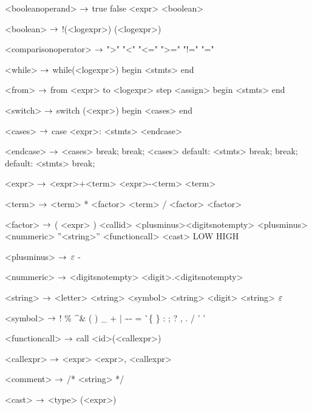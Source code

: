\begin{grammar}
<booleanoperand> $\rightarrow$ true
		\alt false
		\alt <boolean>

<boolean> $\rightarrow$ !(<logexpr>)
		\alt (<logexpr>)

<comparisonoperator> $\rightarrow$ ">"
				\alt "<"
				\alt "<="
				\alt ">="
				\alt "!="
				\alt "="

<while> $\rightarrow$ while(<logexpr>)
		begin
			<stmts>
		end
		
<from> $\rightarrow$ from <expr> to <logexpr> step <assign>
	begin
		<stmts>
	end

<switch> $\rightarrow$ switch (<expr>)
		begin
			<cases>
		end

<cases> $\rightarrow$ case <expr>:
			<stmts>
		<endcase>
		
<endcase> $\rightarrow$ <cases>
		\alt break;
		\alt break;
		<cases>
		\alt default:
			<stmts>
			break;
		\alt break;
		default:
			<stmts>
			break;

<expr> $\rightarrow$ <expr>+<term>
	\alt<expr>-<term>
	\alt<term>

<term> $\rightarrow$ <term> * <factor>
	\alt <term> / <factor>
	\alt <factor>

<factor> $\rightarrow$ ( <expr> )
	\alt <callid>
	\alt <plusminus><digitsnotempty>
	\alt <plusminus><nummeric>
	\alt ''<string>''
	\alt <functioncall> 
	\alt <cast>
	\alt LOW
	\alt HIGH

<plusminus> $\rightarrow$ $\varepsilon$
	\alt -

<nummeric> $\rightarrow$ <digitsnotempty>
	\alt <digit>.<digitsnotempty>

<string> $\rightarrow$ <letter> <string>
\alt <symbol> <string>
\alt <digit> <string>
\alt $\varepsilon$

<symbol> $\rightarrow$ !
\alt \%
\alt \^
\alt \&
\alt *
\alt (
\alt )
\alt \_
\alt +
\alt |
\alt \~
\alt -
\alt =
\alt \`
\alt \{
\alt \}
\alt [
\alt ]
\alt :
\alt ;
\alt ?
\alt ,
\alt .
\alt /
\alt ' '

<functioncall> $\rightarrow$ call <id>(<callexpr>)

<callexpr> $\rightarrow$ <expr>
\alt <expr>, <callexpr>

<comment> $\rightarrow$ /* <string> */

<cast> $\rightarrow$ <type> (<expr>)

\end{grammar}